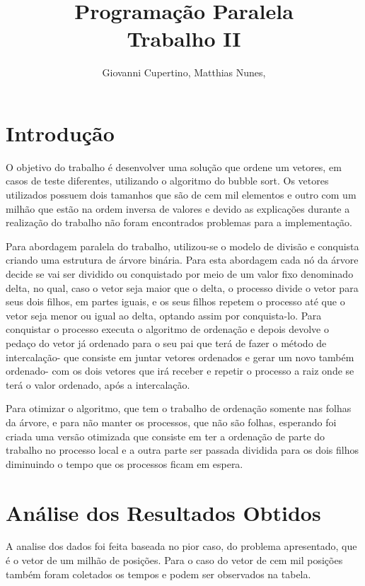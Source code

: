 \documentclass[9pt]{IEEEtran}
\title{Programação Paralela\\ Trabalho II}
\author{Giovanni Cupertino, Matthias Nunes, \IEEEmembership{Usuário pp12820}}
\begin{document}
\maketitle

\section{Introdução}

	O objetivo do trabalho é desenvolver uma solução que ordene um vetores, em
	casos de teste diferentes, utilizando o algoritmo do bubble sort. Os vetores
	utilizados possuem dois tamanhos que são de cem mil elementos e outro com um
	milhão que estão na ordem inversa de valores e devido as explicações durante 
	a realização do trabalho não foram encontrados problemas para a implementação.

	Para abordagem paralela do trabalho, utilizou-se o modelo de divisão e
	conquista criando uma estrutura de árvore binária. Para esta abordagem cada
	nó da árvore decide se vai ser dividido ou conquistado por meio de um valor
	fixo denominado delta, no qual, caso o vetor seja maior que o delta, o
	processo divide o vetor para seus dois filhos, em partes iguais, e os seus
	filhos repetem o processo até que o vetor seja menor ou igual ao delta,
	optando assim por conquista-lo. Para conquistar o processo executa o
	algoritmo de ordenação e depois devolve o pedaço do vetor já ordenado para o
	seu pai que terá de fazer o método de intercalação- que consiste em juntar
	vetores ordenados e gerar um novo também ordenado- com os dois vetores que
	irá receber e repetir o processo a raiz onde se terá o valor ordenado, após
	a intercalação.

	Para otimizar o algoritmo, que tem o trabalho de ordenação somente nas
	folhas da árvore, e para não manter os processos, que não são folhas,
	esperando foi criada uma versão otimizada que consiste em ter a ordenação de
	parte do trabalho no processo local e a outra parte ser passada dividida
	para os dois filhos diminuindo o tempo que os processos ficam em espera.

\section{Análise dos Resultados Obtidos}

	A analise dos dados foi feita baseada no pior caso, do problema apresentado,
	que é o vetor de um milhão de posições. Para o caso do vetor de cem mil
	posições também foram coletados os tempos e podem ser observados na tabela.
\end{document}
